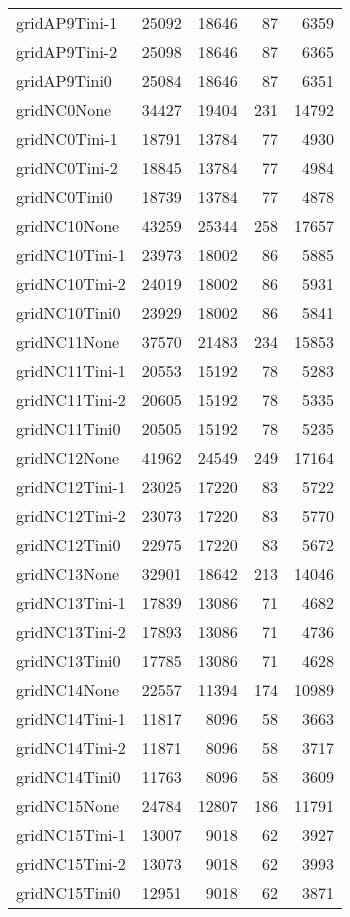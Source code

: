 \begin{longtable}{lrrrr}
gridAP9Tini-1 & 25092 & 18646 & 87 & 6359 \\
gridAP9Tini-2 & 25098 & 18646 & 87 & 6365 \\
gridAP9Tini0 & 25084 & 18646 & 87 & 6351 \\
gridNC0None & 34427 & 19404 & 231 & 14792 \\
gridNC0Tini-1 & 18791 & 13784 & 77 & 4930 \\
gridNC0Tini-2 & 18845 & 13784 & 77 & 4984 \\
gridNC0Tini0 & 18739 & 13784 & 77 & 4878 \\
gridNC10None & 43259 & 25344 & 258 & 17657 \\
gridNC10Tini-1 & 23973 & 18002 & 86 & 5885 \\
gridNC10Tini-2 & 24019 & 18002 & 86 & 5931 \\
gridNC10Tini0 & 23929 & 18002 & 86 & 5841 \\
gridNC11None & 37570 & 21483 & 234 & 15853 \\
gridNC11Tini-1 & 20553 & 15192 & 78 & 5283 \\
gridNC11Tini-2 & 20605 & 15192 & 78 & 5335 \\
gridNC11Tini0 & 20505 & 15192 & 78 & 5235 \\
gridNC12None & 41962 & 24549 & 249 & 17164 \\
gridNC12Tini-1 & 23025 & 17220 & 83 & 5722 \\
gridNC12Tini-2 & 23073 & 17220 & 83 & 5770 \\
gridNC12Tini0 & 22975 & 17220 & 83 & 5672 \\
gridNC13None & 32901 & 18642 & 213 & 14046 \\
gridNC13Tini-1 & 17839 & 13086 & 71 & 4682 \\
gridNC13Tini-2 & 17893 & 13086 & 71 & 4736 \\
gridNC13Tini0 & 17785 & 13086 & 71 & 4628 \\
gridNC14None & 22557 & 11394 & 174 & 10989 \\
gridNC14Tini-1 & 11817 & 8096 & 58 & 3663 \\
gridNC14Tini-2 & 11871 & 8096 & 58 & 3717 \\
gridNC14Tini0 & 11763 & 8096 & 58 & 3609 \\
gridNC15None & 24784 & 12807 & 186 & 11791 \\
gridNC15Tini-1 & 13007 & 9018 & 62 & 3927 \\
gridNC15Tini-2 & 13073 & 9018 & 62 & 3993 \\
gridNC15Tini0 & 12951 & 9018 & 62 & 3871 \\

\end{longtable}
